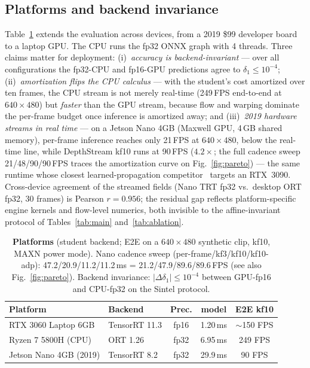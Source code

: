 \documentclass[10pt,twocolumn]{article}
\begin{document}
\subsection{Platforms and backend invariance}
\label{sec:platform}
Table~\ref{tab:platform} extends the evaluation across devices, from a
2019 \$99 developer board to a laptop GPU. The CPU runs the fp32 ONNX graph
with 4 threads. Three claims matter for deployment:
(i)~\emph{accuracy is backend-invariant} --- over all configurations the
fp32-CPU and fp16-GPU predictions agree to $\delta_1 \leq 10^{-4}$;
(ii)~\emph{amortization flips the CPU calculus} --- with the student's cost
amortized over ten frames, the CPU stream is not merely real-time
(249\,FPS end-to-end at $640{\times}480$) but \emph{faster} than the GPU
stream, because flow and warping dominate the per-frame budget once
inference is amortized away; and (iii)~\emph{2019 hardware streams in real
time} --- on a Jetson Nano 4GB (Maxwell GPU, 4\,GB shared memory), per-frame
inference reaches only 21\,FPS at $640{\times}480$, below the real-time
line, while DepthStream kf10 runs at 90\,FPS ($4.2\times$; the full cadence
sweep 21/48/90/90\,FPS traces the amortization curve on
Fig.~\ref{fig:pareto}) --- the same
runtime whose closest learned-propagation competitor~\cite{velodepth}
targets an RTX~3090. Cross-device agreement of the streamed fields
(Nano TRT fp32 vs.\ desktop ORT fp32, 30 frames) is Pearson $r{=}0.956$;
the residual gap reflects platform-specific engine kernels and flow-level
numerics, both invisible to the affine-invariant protocol of
Tables~\ref{tab:main} and~\ref{tab:ablation}.

\begin{table}[t]
\centering\small
\caption{\textbf{Platforms} (student backend; E2E on a $640{\times}480$
synthetic clip, kf10, MAXN power mode). Nano cadence sweep
(per-frame/kf3/kf10/kf10-adp): 47.2/20.9/11.2/11.2\,ms
= 21.2/47.9/89.6/89.6\,FPS (see also Fig.~\ref{fig:pareto}).
Backend invariance: $|\Delta\delta_1| \leq 10^{-4}$ between GPU-fp16 and
CPU-fp32 on the Sintel protocol.}
\label{tab:platform}
\begin{tabular}{llccc}
\toprule
Platform & Backend & Prec. & model & E2E kf10\\
\midrule
RTX 3060 Laptop 6GB & TensorRT 11.3 & fp16 & 1.20\,ms & $\sim$150 FPS\\
Ryzen 7 5800H (CPU) & ORT 1.26 & fp32 & 6.95\,ms & 249 FPS\\
Jetson Nano 4GB (2019) & TensorRT 8.2 & fp32 & 29.9\,ms & 90 FPS\\
\bottomrule
\end{tabular}
\end{table}
\end{document}
